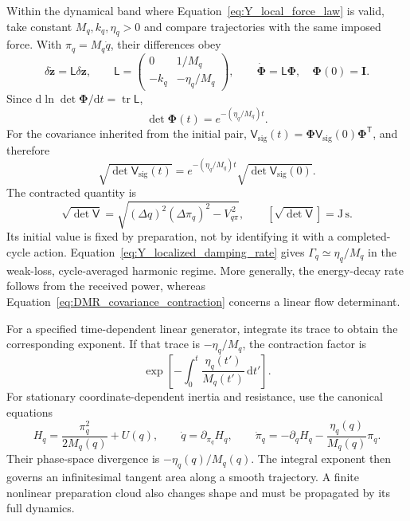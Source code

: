 Within the dynamical band where Equation~\eqref{eq:Y_local_force_law} is valid, take constant $M_q,k_q,\eta_q>0$ and compare trajectories with the same imposed force. With $\pi_q=M_q\dot q$, their differences obey
\begin{equation}
 \delta\dot{\mathbf z}=\mathsf L\delta\mathbf z,
 \qquad
 \mathsf L=\begin{pmatrix}
 0&1/M_q\\-k_q&-\eta_q/M_q
 \end{pmatrix},
 \qquad
 \dot{\boldsymbol\Phi}=\mathsf L\boldsymbol\Phi,
 \quad\boldsymbol\Phi(0)=\mathbf I.
\label{eq:DMR_local_generator}
\end{equation}
Since $\mathrm d\ln\det\boldsymbol\Phi/\mathrm dt=\operatorname{tr}\mathsf L$,
\begin{equation}
 \det\boldsymbol\Phi(t)=e^{-(\eta_q/M_q)t}.
\label{eq:DMR_flow_determinant}
\end{equation}
For the covariance inherited from the initial pair,
$\mathsf V_{\mathrm{sig}}(t)=\boldsymbol\Phi\mathsf V_{\mathrm{sig}}(0)\boldsymbol\Phi^{\mathsf T}$, and therefore
\begin{equation}
 \boxed{
 \sqrt{\det\mathsf V_{\mathrm{sig}}(t)}
 =e^{-(\eta_q/M_q)t}
 \sqrt{\det\mathsf V_{\mathrm{sig}}(0)}
 }.
\label{eq:DMR_covariance_contraction}
\end{equation}
The contracted quantity is
\begin{equation}
 \sqrt{\det\mathsf V}
 =\sqrt{(\Delta q)^2(\Delta \pi_q)^2-V_{q\pi}^{\,2}},
 \qquad [\sqrt{\det\mathsf V}]=\mathrm{J\,s}.
\end{equation}
Its initial value is fixed by preparation, not by identifying it with a completed-cycle action. Equation~\eqref{eq:Y_localized_damping_rate} gives $\Gamma_q\simeq\eta_q/M_q$ in the weak-loss, cycle-averaged harmonic regime. More generally, the energy-decay rate follows from the received power, whereas Equation~\eqref{eq:DMR_covariance_contraction} concerns a linear flow determinant.

For a specified time-dependent linear generator, integrate its trace to obtain the corresponding exponent. If that trace is $-\eta_q/M_q$, the contraction factor is
\begin{equation}
 \exp\!\left[-\int_0^t\frac{\eta_q(t')}{M_q(t')}\,\mathrm dt'\right].
\end{equation}
For stationary coordinate-dependent inertia and resistance, use the canonical equations
\begin{equation}
 H_q=\frac{\pi_q^2}{2M_q(q)}+U(q),
 \qquad
 \dot q=\partial_{\pi_q}H_q,
 \qquad
 \dot \pi_q=-\partial_qH_q-\frac{\eta_q(q)}{M_q(q)}\pi_q.
\end{equation}
Their phase-space divergence is $-\eta_q(q)/M_q(q)$. The integral exponent then governs an infinitesimal tangent area along a smooth trajectory. A finite nonlinear preparation cloud also changes shape and must be propagated by its full dynamics.

